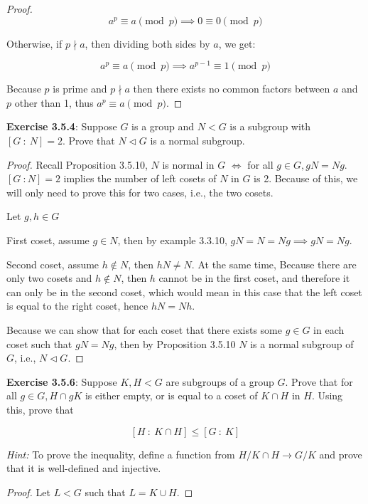 \documentclass[a4paper]{article}
\begin{document}
\begin{myparindent}{0pt}
\begin{proof}
  \[ a^p \equiv a \pmod p \implies 0 \equiv 0 \pmod p \]

  Otherwise, if $p \nmid a$, then dividing both sides by $a$, we get:

  \[ a^p \equiv a \pmod p \implies a^{p-1} \equiv 1 \pmod p \]

  Because $p$ is prime and $p \nmid a$ then there exists no common factors
  between $a$ and $p$ other than 1, thus $a^p \equiv a \pmod p$.
\end{proof}

\textbf{Exercise 3.5.4}:
Suppose $G$ is a group and $N < G$ is a subgroup with $[G ~: ~N] = 2$. Prove
that $N \triangleleft G$ is a normal subgroup.
\begin{proof}
  Recall Proposition 3.5.10, $N$ is normal in $G$ $\iff$ for all $g \in G, gN = Ng$.
  \newline
  $[G ~: N] = 2$ implies the number of left cosets of $N$ in $G$ is 2. Because
  of this, we will only need to prove this for two cases, i.e., the two cosets.
  \newline

  Let $g, h \in G$

  First coset, assume $g \in N$, then by example 3.3.10, $gN = N = Ng \implies gN = Ng$.

  Second coset, assume $h \notin N$, then $hN \neq N$. At the same time, Because
  there are only two cosets and $h \notin N$, then $h$ cannot be in the first
  coset, and therefore it can only be in the second coset, which would mean in
  this case that the left coset is equal to the right coset, hence $hN = Nh$. \newline

  Because we can show that for each coset that there exists some $g \in G$ in
  each coset such that $gN = Ng$, then by Proposition 3.5.10 $N$ is a normal
  subgroup of $G$, i.e., $N \triangleleft G$.
\end{proof}

\textbf{Exercise 3.5.6}:
Suppose $K, H < G$ are subgroups of a group $G$. Prove that for all $g \in G,
H \cap gK$ is either empty, or is equal to a coset of $K \cap H$ in $H$. Using
this, prove that

\[ [H ~: ~K \cap H] \le [G ~: ~K] \]

\textit{Hint:} To prove the inequality, define a function from $H/K \cap H
\rightarrow G/K$ and prove that it is well-defined and injective.
\begin{proof}
  Let $L < G$ such that $L = K \cup H$.


\end{proof}
\end{myparindent}
\end{document}
